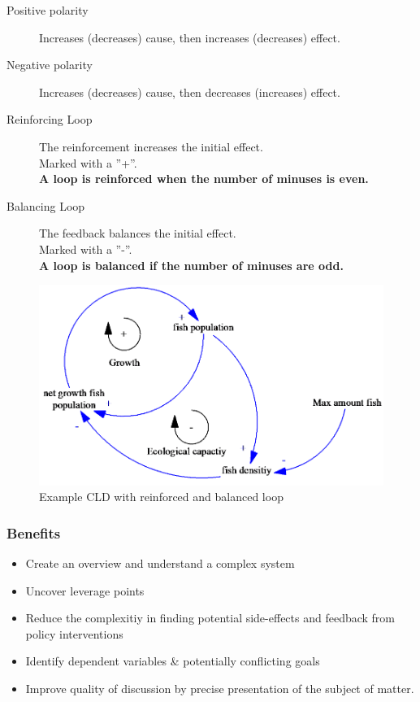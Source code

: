 \begin{description}
	\item[Positive polarity] Increases (decreases) cause, then increases
	(decreases) effect.
	\item[Negative polarity] Increases (decreases) cause, then decreases
	(increases) effect.
	\item[Reinforcing Loop] The reinforcement increases the initial effect.\\
	Marked with a ''+''.\\
	\textbf{A loop is reinforced when the number of minuses is even.}
	\item[Balancing Loop] The feedback balances the initial effect.\\
	Marked with a ''-''.\\
	\textbf{A loop is balanced if the number of minuses are odd.}
\end{description}

\begin{figure}[H]
\centering
\includegraphics[width=.6\textwidth]{figures/cldFishpopulation.png}
\caption{Example CLD with reinforced and balanced loop}
\end{figure}

\subsubsection{Benefits}

\begin{itemize}
	\tightlist
	\item Create an overview and understand a complex system
	\item Uncover leverage points
	\item Reduce the complexitiy in finding potential side-effects and feedback
	from policy interventions
	\item Identify dependent variables \& potentially conflicting goals
	\item Improve quality of discussion by precise presentation of the subject
	of matter.
\end{itemize}

